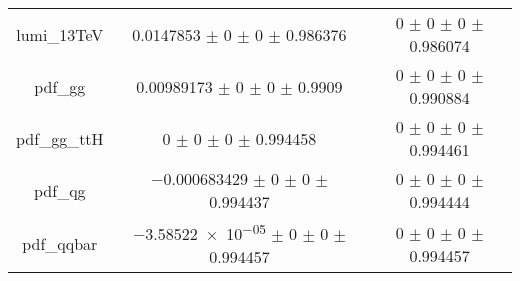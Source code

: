 \begin{table}
\begin{tabular}{ccc}
lumi\_13TeV & \num{0.0147853} $\pm$ \num{0} $\pm$ \num{0} $\pm$ \num{0.986376} & \num{0} $\pm$ \num{0} $\pm$ \num{0} $\pm$ \num{0.986074}\\
pdf\_gg & \num{0.00989173} $\pm$ \num{0} $\pm$ \num{0} $\pm$ \num{0.9909} & \num{0} $\pm$ \num{0} $\pm$ \num{0} $\pm$ \num{0.990884}\\
pdf\_gg\_ttH & \num{0} $\pm$ \num{0} $\pm$ \num{0} $\pm$ \num{0.994458} & \num{0} $\pm$ \num{0} $\pm$ \num{0} $\pm$ \num{0.994461}\\
pdf\_qg & \num{-0.000683429} $\pm$ \num{0} $\pm$ \num{0} $\pm$ \num{0.994437} & \num{0} $\pm$ \num{0} $\pm$ \num{0} $\pm$ \num{0.994444}\\
pdf\_qqbar & \num{-3.58522e-05} $\pm$ \num{0} $\pm$ \num{0} $\pm$ \num{0.994457} & \num{0} $\pm$ \num{0} $\pm$ \num{0} $\pm$ \num{0.994457}\\
\bottomrule
\end{tabular}
\end{table}